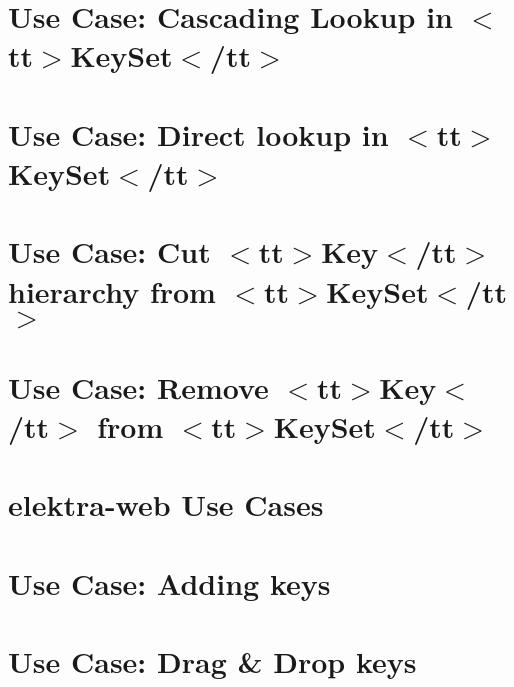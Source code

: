 \let\mypdfximage\pdfximage\def\pdfximage{\immediate\mypdfximage}\documentclass[twoside]{book}
\newcommand{\+}{\discretionary{\mbox{\scriptsize$\hookleftarrow$}}{}{}}
\begin{document}
\chapter{Use Case\+: Cascading Lookup in $<$tt$>$Key\+Set$<$/tt$>$}
\label{doc_usecases_core_UC_keyset_lookup_cascading_md}

\chapter{Use Case\+: Direct lookup in $<$tt$>$Key\+Set$<$/tt$>$}
\label{doc_usecases_core_UC_keyset_lookup_direct_md}

\chapter{Use Case\+: Cut $<$tt$>$Key$<$/tt$>$ hierarchy from $<$tt$>$Key\+Set$<$/tt$>$}
\label{doc_usecases_core_UC_keyset_lookup_hierarchy_md}

\chapter{Use Case\+: Remove $<$tt$>$Key$<$/tt$>$ from $<$tt$>$Key\+Set$<$/tt$>$}
\label{doc_usecases_core_UC_keyset_remove_md}

\chapter{elektra-\/web Use Cases}
\label{doc_usecases_elektra_web_README_md}

\chapter{Use Case\+: Adding keys}
\label{doc_usecases_elektra_web_UC_adding_keys_md}

\chapter{Use Case\+: Drag \& Drop keys}
\label{doc_usecases_elektra_web_UC_drag_n_drop_md}

\end{document}
